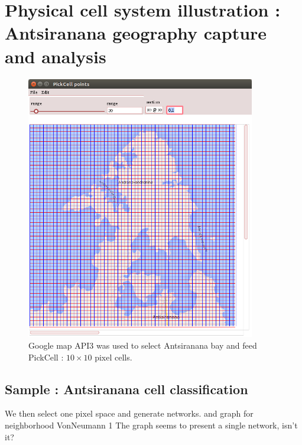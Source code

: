 \section {Physical cell system illustration :  Antsiranana geography capture and analysis }

\begin{figure}[hbtp]
\begin{center} 
\includegraphics[width=10cm]{diego-split-10x10.png}
\caption{Google map API3 was used to select Antsiranana bay and feed PickCell : $10 \times 10$ pixel cells.}
\label{fif:sampleAntsiranana}
\end{center}
\end{figure}

\subsection {Sample : Antsiranana  cell classification  }

We then select one pixel space and generate networks. and graph for neighborhood VonNeumann 1
The graph seems to present a single network, isn't it?

